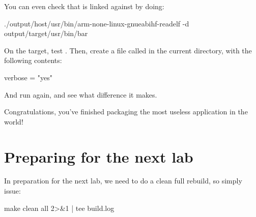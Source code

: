 You can even check that  is linked against
 by doing:

\begin{bashinput}
./output/host/usr/bin/arm-none-linux-gnueabihf-readelf -d output/target/usr/bin/bar
\end{bashinput}

On the target, test . Then, create a file called
 in the current directory, with the following contents:

\begin{fileinput}
verbose = "yes"
\end{fileinput}

And run  again, and see what difference it makes.

Congratulations, you've finished packaging the most useless application
in the world!

\section{Preparing for the next lab}

In preparation for the next lab, we need to do a clean full rebuild,
so simply issue:

\begin{bashinput}
make clean all 2>&1 | tee build.log
\end{bashinput}
